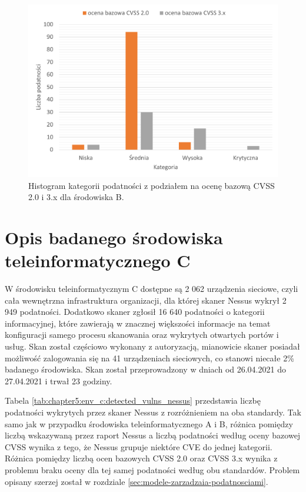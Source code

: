 \begin{figure}[!ht]
\centering
\includegraphics[width=.8\textwidth]{Chapters/Srodowiska/env_B/env_b_stats.pdf}
\caption{Histogram kategorii podatności z podziałem na ocenę bazową CVSS 2.0 i 3.x dla środowiska B.}
\label{fig:chapter5:env_b:env_stats}
\end{figure}




\section{Opis badanego środowiska teleinformatycznego C}
\label{sec:desc_c}
W środowisku teleinformatycznym C dostępne są 2 062 urządzenia sieciowe, czyli cała wewnętrzna infrastruktura organizacji, dla której skaner Nessus wykrył 2 949 podatności. Dodatkowo skaner zgłosił 16 640 podatności o kategorii informacyjnej, które zawierają w znacznej większości informacje na temat konfiguracji samego procesu skanowania oraz wykrytych otwartych portów i usług. Skan został częściowo wykonany z autoryzacją, mianowicie skaner posiadał możliwość zalogowania się na 41 urządzeniach sieciowych, co stanowi niecałe 2\% badanego środowiska. Skan został przeprowadzony w dniach od 26.04.2021 do 27.04.2021 i trwał 23 godziny. 

\bigbreak
Tabela \ref{tab:chapter5:env_c:detected_vulns_nessus} przedstawia liczbę podatności wykrytych przez skaner Nessus z rozróżnieniem na oba standardy. Tak samo jak w przypadku środowiska teleinformatycznego A i B, różnica pomiędzy liczbą wskazywaną przez raport Nessus a liczbą podatności według oceny bazowej CVSS wynika z tego, że Nessus grupuje niektóre CVE do jednej kategorii. Różnica pomiędzy liczbą ocen bazowych CVSS 2.0 oraz CVSS 3.x wynika z problemu braku oceny dla tej samej podatności według obu standardów. Problem opisany szerzej został w rozdziale \ref{sec:modele-zarzadzaia-podatnosciami}.

